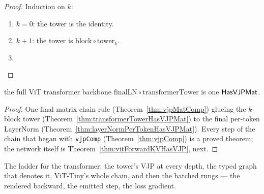 \begin{proof}
\leanok
Induction on \(k\):
\begin{enumerate}
  \item \Case{} \(k = 0\): the tower is the identity.
  \item \Case{} \(k + 1\): the tower is
    \(\mathrm{block} \circ \mathrm{tower}_k\).
  \item \Qed{}
\end{enumerate}
\end{proof}

\begin{theorem}
  \label{thm:vitBodyHasVJPMat}
  \leanok
  \Prove{} the full ViT transformer backbone
  \(\mathrm{finalLN} \circ \mathrm{transformerTower}\) is one
  \(\mathsf{HasVJPMat}\).
\end{theorem}

\begin{proof}
\leanok
One final matrix chain rule (Theorem~\ref{thm:vjpMatComp}) glueing
the \(k\)-block tower
(Theorem~\ref{thm:transformerTowerHasVJPMat}) to the final
per-token LayerNorm
(Theorem~\ref{thm:layerNormPerTokenHasVJPMat}). Every step of
the chain that began with \texttt{vjpComp} (Theorem~\ref{thm:vjpComp})
is a proved theorem; the network itself is
Theorem~\ref{thm:vitForwardKVHasVJP}, next. \Qed{}
\end{proof}

The ladder for the transformer: the tower's VJP at every depth, the typed
graph that denotes it, ViT-Tiny's whole chain, and then the batched rungs ---
the rendered backward, the emitted step, the loss gradient.

